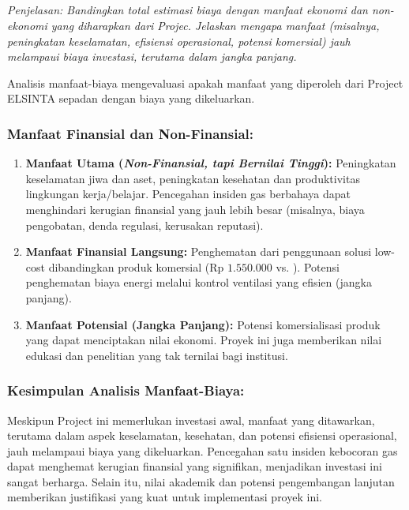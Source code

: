 \documentclass{elsinta}
\begin{document}
\subsection{\CostBenefitTitle}
\textit{Penjelasan: Bandingkan total estimasi biaya dengan manfaat ekonomi dan non-ekonomi yang diharapkan dari Projec. Jelaskan mengapa manfaat (misalnya, peningkatan keselamatan, efisiensi operasional, potensi komersial) jauh melampaui biaya investasi, terutama dalam jangka panjang.}

Analisis manfaat-biaya mengevaluasi apakah manfaat yang diperoleh dari Project ELSINTA sepadan dengan biaya yang dikeluarkan.

\subsubsection*{Manfaat Finansial dan Non-Finansial:}
\begin{enumerate}
    \item \textbf{Manfaat Utama (\emph{Non-Finansial, tapi Bernilai Tinggi}):} Peningkatan keselamatan jiwa dan aset, peningkatan kesehatan dan produktivitas lingkungan kerja/belajar. Pencegahan insiden gas berbahaya dapat menghindari kerugian finansial yang jauh lebih besar (misalnya, biaya pengobatan, denda regulasi, kerusakan reputasi).
    \item \textbf{Manfaat Finansial Langsung:} Penghematan dari penggunaan solusi low-cost dibandingkan produk komersial ($\text{Rp 1.550.000}$ vs. ). Potensi penghematan biaya energi melalui kontrol ventilasi yang efisien (jangka panjang).
    \item \textbf{Manfaat Potensial (Jangka Panjang):} Potensi komersialisasi produk yang dapat menciptakan nilai ekonomi. Proyek ini juga memberikan nilai edukasi dan penelitian yang tak ternilai bagi institusi.
\end{enumerate}

\subsubsection*{Kesimpulan Analisis Manfaat-Biaya:}
Meskipun Project ini memerlukan investasi awal, manfaat yang ditawarkan, terutama dalam aspek keselamatan, kesehatan, dan potensi efisiensi operasional, jauh melampaui biaya yang dikeluarkan. Pencegahan satu insiden kebocoran gas dapat menghemat kerugian finansial yang signifikan, menjadikan investasi ini sangat berharga. Selain itu, nilai akademik dan potensi pengembangan lanjutan memberikan justifikasi yang kuat untuk implementasi proyek ini.
\end{document}

